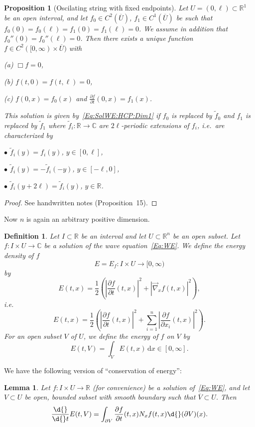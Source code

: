 \documentclass[12pt, oneside, a4paper]{article}
\newtheorem{lem}[thm]{Lemma}
\newtheorem{prop}[thm]{Proposition}
\def\grad{\operatorname{grad}}
\theoremstyle{dfn}
\newtheorem{dfn}[thm]{Definition}
\def \grad {\overrightarrow{\nabla}}
\def\Rbb{\ensuremath{\mathbb{R}}}
\def\dx{\,\mathrm dx}
\newcommand{\Com}{\mathbb{C}}
\providecommand{\Abs}[1]{\left\lvert#1\right\rvert}
\begin{document}
\begin{prop}[Oscilating string with fixed endpoints]
Let $U = (0,\ell) \subset \Rbb^1$ be an open interval, and let $f_0 \in C^2(\overline{U})$, $f_1 \in C^1(\overline{U})$ be such that $f_0(0) = f_0(\ell) = f_1(0) = f_1(\ell) = 0$. We assume in addition that $f_0''(0) = f_0''(\ell) = 0$. Then there exists a unique function $f \in C^2([0,\infty) \times \overline{U})$ with

(a) $\Box f = 0$,

(b) $f(t,0) = f(t,\ell) = 0$,

(c) $f(0,x) = f_0(x)$ and $\frac{\partial f}{\partial t} (0,x) = f_1(x)$.

\noindent This solution is given by~\eqref{Eq:SolWE:HCP:Dim1} if $f_0$ is replaced by $\widetilde{f}_0$ and $f_1$ is replaced by $\widetilde{f}_1$ where $\widetilde{f}_i \colon \Rbb \to \Com$ are $2\ell$-periodic extensions of $f_i$, i.e.\ are characterized by

$\bullet$ $\widetilde{f}_i(y) = f_i(y)$, $y \in [0,\ell]$,

$\bullet$ $\widetilde{f}_i(y) = -\widetilde{f}_i(-y)$, $y \in [-\ell,0]$,

$\bullet$ $\widetilde{f}_i(y + 2\ell) = \widetilde{f}_i(y)$, $y \in \Rbb$.
\end{prop}

\begin{proof}
See handwritten notes (Proposition~15).
\end{proof}

Now $n$ is again an arbitrary positive dimension.

\begin{dfn}
Let $I \subset \Rbb$ be an interval and let $U \subset \Rbb^n$ be an open subset. Let $f \colon I \times U \to \Com$ be a solution of the wave equation~\eqref{Eq:WE}. We define the energy density of $f$
\[
E = E_f \colon I \times U \to [0,\infty)
\]
by
\[
E(t,x) = \frac{1}{2} \left( \Abs{\frac{\partial f}{\partial t}(t,x)}^2 + \Abs{\grad_x f(t,x)}^2 \right),
\]
i.e.\
\[
E(t,x) = \frac{1}{2} \left( \Abs{\frac{\partial f}{\partial t}(t,x)}^2 + \sum_{i=1}^n \Abs{\frac{\partial f}{\partial x_i} (t,x)}^2 \right).
\]
For an open subset $V$ of $U$, we define the energy of $f$ on $V$ by
\[
E(t,V) = \int_V E(t,x) \dx \in [0,\infty].
\]
\end{dfn}

We have the following version of ``conservation of energy'':

\begin{lem}
Let $f \colon I \times U \to \Rbb$ (for convenience) be a solution of~\eqref{Eq:WE}, and let $V \subset U$ be open, bounded subset with smooth boundary such that $\overline{V} \subset U$. Then
\[
\frac{\d{}}{\d{}t} E(t,V) = \int_{\partial V} \frac{\partial f}{\partial t} (t,x) N_x f(t,x) \d{}(\partial V)(x).
\]
\end{lem}
\end{document}
